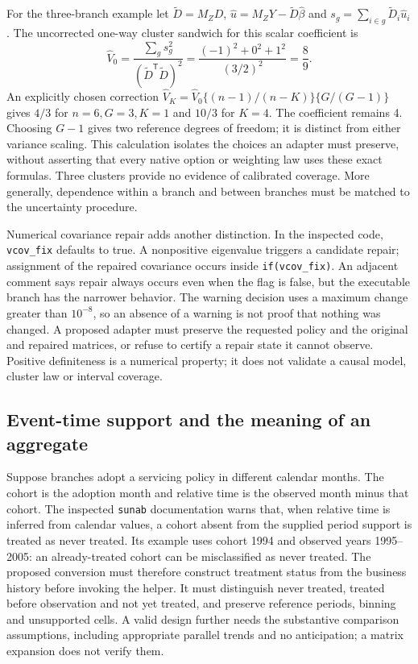 For the three-branch example let $\widetilde D=M_ZD$,
$\widehat u=M_ZY-\widetilde D\widehat\beta$ and
$s_g=\sum_{i\in g}\widetilde D_i\widehat u_i$. The uncorrected one-way
cluster sandwich for this scalar coefficient is
\begin{equation}
 \widehat V_0=\frac{\sum_gs_g^2}{(\widetilde D^{\mathsf T}\widetilde D)^2}
 =\frac{(-1)^2+0^2+1^2}{(3/2)^2}=\frac89.
 \label{exec20:fx-cluster}
\end{equation}
An explicitly chosen correction
$\widehat V_K=\widehat V_0\{(n-1)/(n-K)\}\{G/(G-1)\}$ gives
$4/3$ for $n=6,G=3,K=1$ and $10/3$ for $K=4$. The coefficient remains 4.
Choosing $G-1$ gives two reference degrees of freedom; it is distinct from
either variance scaling. This calculation isolates the choices an adapter
must preserve, without asserting that every native option or weighting law
uses these exact formulas. Three clusters provide no evidence of calibrated
coverage. More generally, dependence within a branch and between branches
must be matched to the uncertainty procedure.~\citep{exec20_fixest_reference}

Numerical covariance repair adds another distinction. In the inspected code,
\texttt{vcov\_fix} defaults to true. A nonpositive eigenvalue triggers a
candidate repair; assignment of the repaired covariance occurs inside
\texttt{if(vcov\_fix)}. An adjacent comment says repair always occurs even
when the flag is false, but the executable branch has the narrower behavior.
The warning decision uses a maximum change greater than $10^{-8}$, so an
absence of a warning is not proof that nothing was changed. A proposed
adapter must preserve the requested policy and the original and repaired
matrices, or refuse to certify a repair state it cannot observe. Positive
definiteness is a numerical property; it does not validate a causal model,
cluster law or interval coverage.~\citep{exec20_fixest_source}

\subsection{Event-time support and the meaning of an aggregate}
\label{exec20:fx-eventtime}
Suppose branches adopt a servicing policy in different calendar months.
The cohort is the adoption month and relative time is the observed month
minus that cohort. The inspected \texttt{sunab} documentation warns that,
when relative time is inferred from calendar values, a cohort absent from
the supplied period support is treated as never treated. Its example uses
cohort 1994 and observed years 1995--2005: an already-treated cohort can be
misclassified as never treated. The proposed conversion must therefore
construct treatment status from the business history before invoking the
helper. It must distinguish never treated, treated before observation and
not yet treated, and preserve reference periods, binning and unsupported
cells. A valid design further needs the substantive comparison assumptions,
including appropriate parallel trends and no anticipation; a matrix expansion
does not verify them.~\citep{exec20_fixest_source}

